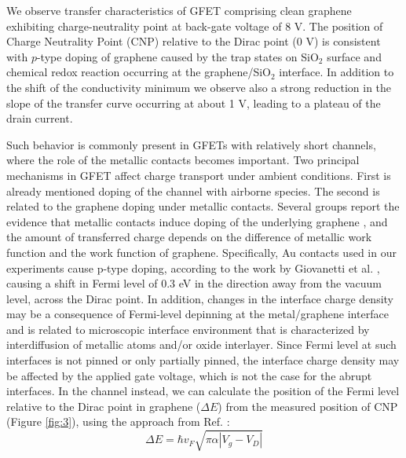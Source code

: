 \documentclass[preprint,aip,jap]{revtex4-2}
\begin{document}
We observe transfer characteristics of GFET comprising clean graphene exhibiting charge-neutrality point at back-gate voltage of 8 V.
  The position of Charge Neutrality Point (CNP) relative to the Dirac point (0 V) is consistent with $p$-type doping of graphene caused by the trap states on SiO$_{2}$ surface and chemical redox reaction occurring at the graphene/SiO$_{2}$ interface\cite{feng-2014,peng-2017,lafkioti-2010}.
  In addition to the shift of the conductivity minimum we observe also a strong reduction in the slope of the transfer curve occurring at about 1 V, leading to a plateau of the drain current.

  Such behavior is commonly present in GFETs with relatively short channels, where the role of the metallic contacts becomes important\cite{bartolomeo-2015,nouchi-2008,nouchi-2014}.
 Two principal mechanisms in GFET affect charge transport under ambient conditions.
 First is already mentioned doping of the channel with airborne species.
 The second is related to the graphene doping under metallic contacts\cite{farmer-2009,giovannetti-2008,lee-2008,mueller-2009}.
  Several groups report the evidence that metallic contacts induce doping of the underlying graphene \cite{giovannetti-2008,mueller-2009,huard-2008}, and the amount of transferred charge depends on the difference of metallic work function and the work function of graphene.
  Specifically, Au contacts used in our experiments cause p-type doping, according to the work by Giovanetti et al.
\cite{giovannetti-2008}, causing a shift in Fermi level of 0.3 eV in the direction away from the vacuum level, across the Dirac point.
 In addition, changes in the interface charge density may be a consequence of Fermi-level depinning at the metal/graphene interface and is related to microscopic interface environment that is characterized by interdiffusion of metallic atoms and/or oxide interlayer\cite{nouchi-2008,nouchi-2014}.
 Since Fermi level at such interfaces is not pinned or only partially pinned\cite{dibartolomeo-2011}, the interface charge density may be affected by the applied gate voltage, which is not the case for the abrupt interfaces.
  In the channel instead, we can calculate the position of the Fermi level relative to the Dirac point in graphene ($\Delta E$) from the measured position of CNP (Figure \ref{fig:3}), using the approach from Ref.
 :
\begin{equation}
  \label{eq:1}
  \Delta E = \hbar v_{F}\sqrt{\pi\alpha|V_{g}-V_{D}|}
\end{equation}
\end{document}
